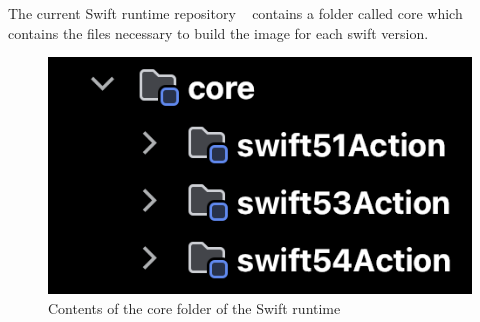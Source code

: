 The current Swift runtime repository ~\cite{swift-runtime} contains a folder called core which contains the files necessary to build the image for each swift version.
\begin{figure}[h]
    \centering
    \includegraphics[width=\textwidth]{media/core_contents.png}
    \caption{Contents of the core folder of the Swift runtime}
    \label{fig:core_contents}
\end{figure}

